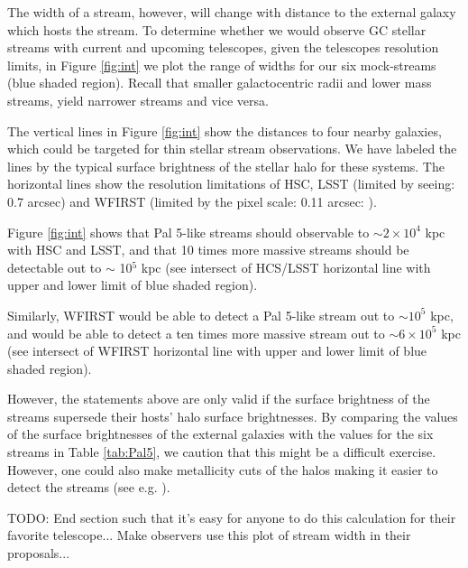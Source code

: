 \documentclass[twocolumn]{aastex62}
\newcommand{\todo}[1]{{\color{red} TODO: #1}}
\begin{document}
The width of a stream, however, will change with distance to the external galaxy which hosts the stream. To determine whether we would observe GC stellar streams with current and upcoming telescopes, given the telescopes resolution limits, in Figure \ref{fig:int} we plot the range of widths for our six mock-streams (blue shaded region). Recall that smaller galactocentric radii and lower mass streams, yield narrower streams and vice versa. %

The vertical lines in Figure \ref{fig:int} show the distances to four nearby galaxies, which could be targeted for thin stellar stream observations. We have labeled the lines by the typical surface brightness of the stellar halo for these systems. The horizontal lines show the resolution limitations of HSC, LSST (limited by seeing: 0.7 arcsec) and WFIRST (limited by the pixel scale: 0.11 arcsec: \citealt{spergel13}).

Figure \ref{fig:int} shows that Pal 5-like streams should observable to $\sim 2\times 10^4$ kpc with HSC and LSST, and that 10 times more massive streams should be detectable out to $\sim$ 10$^5$ kpc (see intersect of HCS/LSST horizontal line with upper and lower limit of blue shaded region). 

Similarly, WFIRST would be able to detect a Pal 5-like stream out to $\sim 10^5$ kpc, and would be able to detect a ten times more massive stream out to $\sim 6 \times 10^5$ kpc (see intersect of WFIRST horizontal line with upper and lower limit of blue shaded region). 

However, the statements above are only valid if the surface brightness of the streams supersede their hosts' halo surface brightnesses. By comparing the values of the surface brightnesses of the external galaxies with the values for the six streams in Table \ref{tab:Pal5}, we caution that this might be a difficult exercise. However, one could also make metallicity cuts of the halos making it easier to detect the streams (see e.g. \citealt{ibata14}).

\todo{End section such that it's easy for anyone to do this calculation for their favorite telescope... Make observers use this plot of stream width in their proposals...}

\end{document}
